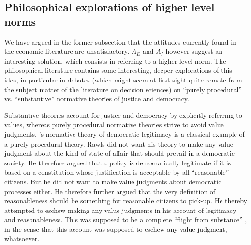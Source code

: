 \documentclass[preprint, french, english, 11pt, authoryear]{elsarticle}%
\begin{document}
\subsection{Philosophical explorations of higher level norms}
\label{sec:higher}
We have argued in the former subsection that the attitudes currently found in the economic literature are unsatisfactory. $A_E$ and $A_I$ however suggest an interesting solution, which consists in referring to a higher level norm. The philosophical literature contains some interesting, deeper explorations of this idea, in particular in debates (which might seem at first sight quite remote from the subject matter of the literature on decision sciences) on “purely procedural” vs. “substantive” normative theories of justice and democracy.

Substantive theories account for justice and democracy by explicitly referring to values, whereas purely procedural normative theories strive to avoid value judgments. \cite{rawls_political_2005}'s normative theory of democratic legitimacy is a classical example of a purely procedural theory. Rawls did not want his theory to make any value judgment about the kind of state of affair that should prevail in a democratic society. He therefore argued that a policy is democratically legitimate if it is based on a constitution whose justification is acceptable by all  “reasonable” citizens. But he did not want to make value judgments about democratic processes either. He therefore further argued that the very definition of reasonableness should be something for reasonable citizens to pick-up. He thereby attempted to eschew making any value judgments in his account of legitimacy and reasonableness. This was supposed to be a complete ``flight from substance'' \citep{estlund_democratic_2009}, in the sense that this account was supposed to eschew any value judgment, whatsoever.%
\end{document}
